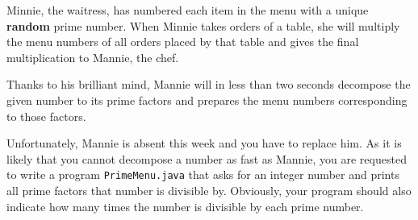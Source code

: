 \documentclass[12pt,letterpaper,twoside]{article}
\begin{document}
Minnie, the waitress, has numbered each item in the menu with a unique \textbf{random} prime number. When Minnie takes orders of a table, she will multiply the menu numbers of all orders placed by that table and gives the final multiplication to Mannie, the chef.

Thanks to his brilliant mind, Mannie will in less than two seconds decompose the given number to its prime factors and prepares the menu numbers corresponding to those factors.

Unfortunately, Mannie is absent this week and you have to replace him. As it is likely that you cannot decompose a number as fast as Mannie, you are requested to write a program \texttt{PrimeMenu.java} that asks for an integer number and prints all prime factors that number is divisible by. Obviously, your program should also indicate how many times the number is divisible by each prime number.
\end{document}
